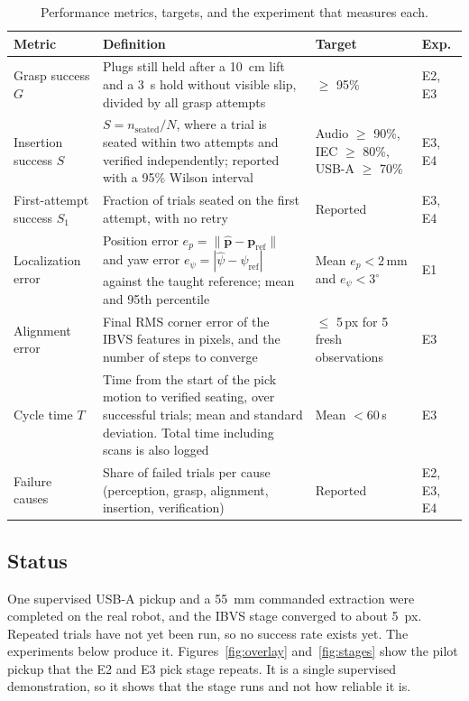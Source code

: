 \documentclass[11pt,conference]{IEEEtran}
\begin{document}
\begin{table}[!t]
\caption{Performance metrics, targets, and the experiment that measures each.}
\label{tab:metrics}
\centering
\small
\renewcommand{\arraystretch}{1.15}
\begin{tabular}{@{}p{3.3cm}p{8.6cm}p{3.6cm}p{1.2cm}@{}}
\toprule
\textbf{Metric} & \textbf{Definition} & \textbf{Target} & \textbf{Exp.}\\
\midrule
Grasp success $G$ & Plugs still held after a 10~cm lift and a 3~s hold without visible slip, divided by all grasp attempts & $\geq$ 95\% & E2, E3\\
Insertion success $S$ & $S=n_{\mathrm{seated}}/N$, where a trial is seated within two attempts and verified independently; reported with a 95\% Wilson interval~\cite{wilson1927} & Audio $\geq$ 90\%, IEC $\geq$ 80\%, USB-A $\geq$ 70\% & E3, E4\\
First-attempt success $S_1$ & Fraction of trials seated on the first attempt, with no retry & Reported & E3, E4\\
Localization error & Position error $e_p=\lVert\hat{\mathbf p}-\mathbf p_{\mathrm{ref}}\rVert$ and yaw error $e_\psi=|\hat\psi-\psi_{\mathrm{ref}}|$ against the taught reference; mean and 95th percentile & Mean $e_p<2$\,mm and $e_\psi<3^\circ$ & E1\\
Alignment error & Final RMS corner error of the IBVS features in pixels, and the number of steps to converge & $\leq$ 5\,px for 5 fresh observations & E3\\
Cycle time $T$ & Time from the start of the pick motion to verified seating, over successful trials; mean and standard deviation. Total time including scans is also logged & Mean $<60$\,s & E3\\
Failure causes & Share of failed trials per cause (perception, grasp, alignment, insertion, verification) & Reported & E2, E3, E4\\
\bottomrule
\end{tabular}
\end{table}

\subsection{Status}

One supervised USB-A pickup and a 55~mm commanded extraction were completed on the real robot, and the IBVS stage converged to about 5~px. Repeated trials have not yet been run, so no success rate exists yet. The experiments below produce it. Figures~\ref{fig:overlay} and~\ref{fig:stages} show the pilot pickup that the E2 and E3 pick stage repeats. It is a single supervised demonstration, so it shows that the stage runs and not how reliable it is.
\end{document}
